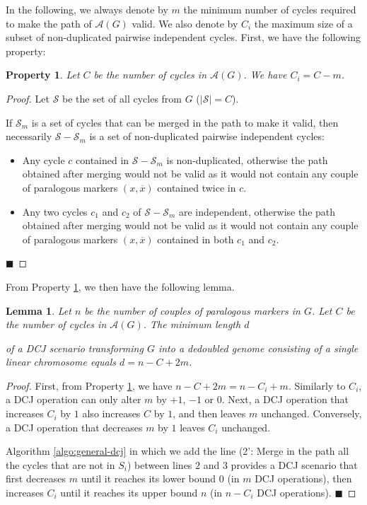 \documentclass[11pt,final,twoside,nofrench]{thlifl}
\newcommand{\qed}{\ensuremath{\blacksquare}}
\newcommand{\snd}[1]{ \ensuremath{\overline{#1}} }
\newtheorem{property}{Property}
\newtheorem{proof}{Proof}
\newtheorem{lemma}{Lemma}
\begin{document}
In the following, we always denote by $m$ the minimum number of cycles
required to make the path of $\mathcal{A}(G)$ valid. We also denote by $C_{i}$ 
the maximum size of a subset of non-duplicated pairwise independent cycles.
First, we have the following property:
 \begin{property}
\label{prop:cycles}
Let $C$ be the number of cycles in $\mathcal{A}(G)$. We have $C_i=C-m$.
\end{property}
\begin{proof}
Let $\mathcal{S}$ be the set of all cycles from $G$ ($|\mathcal{S}| = C$).

If $\mathcal{S}_m$ is a set of
cycles that can be merged in the path to make it valid, then  necessarily
$\mathcal{S}-\mathcal{S}_m$ is a set of non-duplicated pairwise independent cycles: 
\begin{itemize}
\item Any cycle $c$ contained in $\mathcal{S}-\mathcal{S}_m$ is non-duplicated, 
otherwise the path obtained after merging would not be valid as it would 
not contain any couple  of paralogous markers $(x,\snd{x})$ contained twice 
in $c$. 
\item Any two cycles $c_1$ and $c_2$ of $\mathcal{S}-\mathcal{S}_m$ are 
independent, otherwise the path obtained after merging would not be valid as it 
would not contain any couple of paralogous markers $(x,\snd{x})$ contained 
in both $c_1$ and $c_2$.

\end{itemize}
\qed
\end{proof}

From Property \ref{prop:cycles}, we then have the following lemma.
\begin{lemma}
\label{lem:linear-dcj}
Let $n$ be the number of couples of paralogous markers in $G$. 
Let $C$ be the number of cycles in $\mathcal{A}(G)$.
The  minimum length $d$ 

of a DCJ scenario transforming
$G$ into a dedoubled genome consisting of a single linear 
chromosome equals $d = n-C+2m$.
\end{lemma}
\begin{proof}
First, from Property \ref{prop:cycles}, we have $n-C+2m = n-C_i+m$.
Similarly to $C_i$, a DCJ operation can only alter $m$ by $+1$, $-1$
or $0$.
Next, a DCJ operation that increases $C_i$ by $1$ also increases $C$ by $1$,
and then leaves $m$ unchanged. Conversely, a DCJ operation that decreases $m$ 
by $1$ leaves $C_i$ unchanged.

 Algorithm \ref{algo:general-dcj} in which we add the line 
(2': Merge in the path all the cycles that are not in $S_i$)
between
lines $2$ and $3$
provides a DCJ scenario that first decreases $m$ until it reaches its lower 
bound $0$ (in $m$ DCJ operations), then increases $C_i$ until it reaches its 
upper bound $n$ (in $n-C_i$ DCJ operations). \qed
\end{proof}
\end{document}
